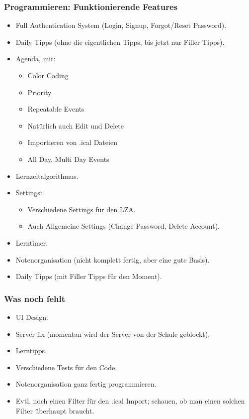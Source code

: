 \documentclass[a4paper,12pt]{article}
\begin{document}
\subsubsection*{Programmieren: Funktionierende Features}
\begin{itemize}
    \item Full Authentication System (Login, Signup, Forgot/Reset Password).
    \item Daily Tipps (ohne die eigentlichen Tipps, bis jetzt nur Filler Tipps).
    \item Agenda, mit:
    \begin{itemize}
        \item Color Coding
        \item Priority
        \item Repeatable Events
        \item Natürlich auch Edit und Delete
        \item Importieren von .ical Dateien
        \item All Day, Multi Day Events
    \end{itemize}
    \item Lernzeitalgorithmus.
    \item Settings:
    \begin{itemize}
        \item Verschiedene Settings für den LZA.
        \item Auch Allgemeine Settings (Change Password, Delete Account).
    \end{itemize}
    \item Lerntimer.
    \item Notenorganisation (nicht komplett fertig, aber eine gute Basis).
    \item Daily Tipps (mit Filler Tipps für den Moment).
\end{itemize}

\subsubsection*{Was noch fehlt}
\begin{itemize}
    \item UI Design.
    \item Server fix (momentan wird der Server von der Schule geblockt).
    \item Lerntipps.
    \item Verschiedene Tests für den Code.
    \item Notenorganisation ganz fertig programmieren.
    \item Evtl. noch einen Filter für den .ical Import; schauen, ob man einen solchen Filter überhaupt braucht.
\end{itemize}
\end{document}
